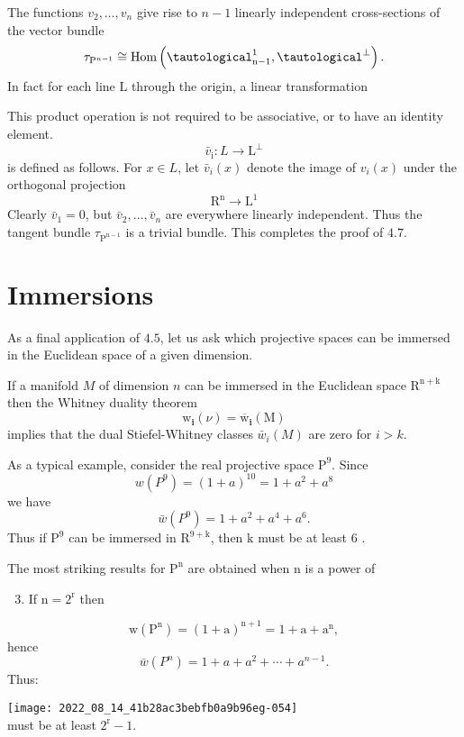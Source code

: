 \documentclass[10pt]{article}
\begin{document}
The functions $v_{2}, \ldots, v_{n}$ give rise to $n-1$ linearly independent cross-sections of the vector bundle
$$
\tau_{\mathrm{P}^{n-1}} \cong \operatorname{Hom}\left(\tautological_{\mathrm{n}-1}^{1}, \tautological^{\perp}\right) .
$$
In fact for each line $\mathrm{L}$ through the origin, a linear transformation

This product operation is not required to be associative, or to have an identity element.
$$
\bar{v}_{\mathrm{i}}: L \rightarrow \mathrm{L}^{\perp}
$$
is defined as follows. For $x \in L$, let $\bar{v}_{i}(x)$ denote the image of $v_{i}(x)$ under the orthogonal projection
$$
\mathrm{R}^{\mathrm{n}} \rightarrow \mathrm{L}^{1}
$$
Clearly $\bar{v}_{1}=0$, but $\bar{v}_{2}, \ldots, \bar{v}_{n}$ are everywhere linearly independent. Thus the tangent bundle $\tau_{\mathrm{P}^{\mathrm{n}-1}}$ is a trivial bundle. This completes the proof of $4.7$.

\section{Immersions}
As a final application of $4.5$, let us ask which projective spaces can be immersed in the Euclidean space of a given dimension.

If a manifold $M$ of dimension $n$ can be immersed in the Euclidean space $\mathrm{R}^{\mathrm{n}+\mathrm{k}}$ then the Whitney duality theorem
$$
\mathrm{w}_{\mathbf{i}}(\nu)=\overline{\mathrm{w}}_{\mathbf{i}}(\mathrm{M})
$$
implies that the dual Stiefel-Whitney classes $\bar{w}_{i}(M)$ are zero for $i>k$.

As a typical example, consider the real projective space $\mathrm{P}^{9}$. Since
$$
w\left(P^{9}\right)=(1+a)^{10}=1+a^{2}+a^{8}
$$
we have
$$
\bar{w}\left(P^{9}\right)=1+a^{2}+a^{4}+a^{6} .
$$
Thus if $\mathrm{P}^{9}$ can be immersed in $\mathrm{R}^{9+\mathrm{k}}$, then $\mathrm{k}$ must be at least 6 .

The most striking results for $\mathrm{P}^{\mathrm{n}}$ are obtained when $\mathrm{n}$ is a power of

\begin{enumerate}
  \setcounter{enumi}{2}
  \item If $\mathrm{n}=2^{\mathrm{r}}$ then
\end{enumerate}
$$
\mathrm{w}\left(\mathrm{P}^{\mathrm{n}}\right)=(1+\mathrm{a})^{\mathrm{n}+1}=1+\mathrm{a}+\mathrm{a}^{\mathrm{n}},
$$
hence
$$
\bar{w}\left(P^{n}\right)=1+a+a^{2}+\cdots+a^{n-1} .
$$
Thus:

\texttt{[image: 2022\_08\_14\_41b28ac3bebfb0a9b96eg-054]}\\
must be at least $2^{\mathrm{r}}-1$.
\end{document}
